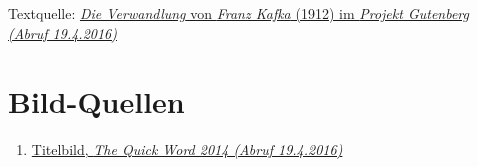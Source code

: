 \documentclass[12pt,a4paper,twoside,titlepage]{article}
\let\oldsection\section
\renewcommand\section{\clearpage\oldsection}
\begin{document}
	\begin{thebibliography}{9}
		 Textquelle: \href{http://gutenberg.spiegel.de/buch/die-verwandlung-165/1}{\textit{Die Verwandlung} von \textit{Franz Kafka} (1912) im \textit{Projekt Gutenberg (Abruf 19.4.2016)}}
		
%			
	\end{thebibliography}
	
	\appendix
	
	\section{Bild-Quellen}
	\begin{enumerate}
		\item \label{qui14} \href{https://thequickword.wordpress.com/2014/01/28/dyslexicatheist-book-review-franz-kafka-the-metamorphosis-die-verwandlung/}{Titelbild, \textit{The Quick Word 2014 (Abruf 19.4.2016)}}
	\end{enumerate}
	
	
	
	
\end{document}
